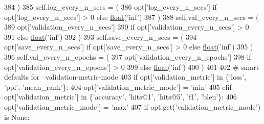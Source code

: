 \begin{DoxyCode}
384         )
385         self.log\_every\_n\_secs = (
386             opt[\textcolor{stringliteral}{'log\_every\_n\_secs'}] \textcolor{keywordflow}{if} opt[\textcolor{stringliteral}{'log\_every\_n\_secs'}] > 0 \textcolor{keywordflow}{else} \hyperlink{namespaceprojects_1_1controllable__dialogue_1_1make__control__dataset_aa2b7207688c641dbc094ab44eca27113}{float}(\textcolor{stringliteral}{'inf'})
387         )
388         self.val\_every\_n\_secs = (
389             opt[\textcolor{stringliteral}{'validation\_every\_n\_secs'}]
390             \textcolor{keywordflow}{if} opt[\textcolor{stringliteral}{'validation\_every\_n\_secs'}] > 0
391             \textcolor{keywordflow}{else} \hyperlink{namespaceprojects_1_1controllable__dialogue_1_1make__control__dataset_aa2b7207688c641dbc094ab44eca27113}{float}(\textcolor{stringliteral}{'inf'})
392         )
393         self.save\_every\_n\_secs = (
394             opt[\textcolor{stringliteral}{'save\_every\_n\_secs'}] \textcolor{keywordflow}{if} opt[\textcolor{stringliteral}{'save\_every\_n\_secs'}] > 0 \textcolor{keywordflow}{else} \hyperlink{namespaceprojects_1_1controllable__dialogue_1_1make__control__dataset_aa2b7207688c641dbc094ab44eca27113}{float}(\textcolor{stringliteral}{'inf'})
395         )
396         self.val\_every\_n\_epochs = (
397             opt[\textcolor{stringliteral}{'validation\_every\_n\_epochs'}]
398             \textcolor{keywordflow}{if} opt[\textcolor{stringliteral}{'validation\_every\_n\_epochs'}] > 0
399             \textcolor{keywordflow}{else} \hyperlink{namespaceprojects_1_1controllable__dialogue_1_1make__control__dataset_aa2b7207688c641dbc094ab44eca27113}{float}(\textcolor{stringliteral}{'inf'})
400         )
401 
402         \textcolor{comment}{# smart defaults for --validation-metric-mode}
403         \textcolor{keywordflow}{if} opt[\textcolor{stringliteral}{'validation\_metric'}] \textcolor{keywordflow}{in} \{\textcolor{stringliteral}{'loss'}, \textcolor{stringliteral}{'ppl'}, \textcolor{stringliteral}{'mean\_rank'}\}:
404             opt[\textcolor{stringliteral}{'validation\_metric\_mode'}] = \textcolor{stringliteral}{'min'}
405         \textcolor{keywordflow}{elif} opt[\textcolor{stringliteral}{'validation\_metric'}] \textcolor{keywordflow}{in} \{\textcolor{stringliteral}{'accuracy'}, \textcolor{stringliteral}{'hits@1'}, \textcolor{stringliteral}{'hits@5'}, \textcolor{stringliteral}{'f1'}, \textcolor{stringliteral}{'bleu'}\}:
406             opt[\textcolor{stringliteral}{'validation\_metric\_mode'}] = \textcolor{stringliteral}{'max'}
407         \textcolor{keywordflow}{if} opt.get(\textcolor{stringliteral}{'validation\_metric\_mode'}) \textcolor{keywordflow}{is} \textcolor{keywordtype}{None}:

\end{DoxyCode}
